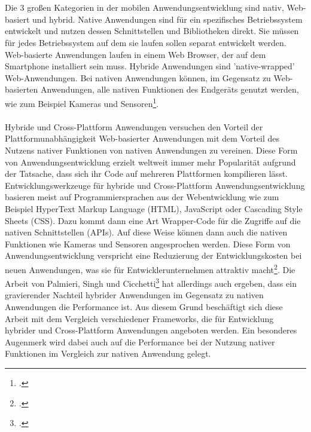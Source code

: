 \\
\\
Die 3 großen Kategorien in der mobilen Anwendungsentwicklung sind nativ, Web-basiert und hybrid. Native Anwendungen sind für ein spezifisches Betriebssystem entwickelt und nutzen dessen Schnittstellen und Bibliotheken direkt. Sie müssen für jedes Betriebssystem auf dem sie laufen sollen separat entwickelt werden. Web-basierte Anwendungen laufen in einem Web Browser, der auf dem Smartphone installiert sein muss. Hybride Anwendungen sind 'native-wrapped' Web-Anwendungen. Bei nativen Anwendungen können, im Gegensatz zu Web-basierten Anwendungen, alle nativen Funktionen des Endgeräts genutzt werden, wie zum Beispiel Kameras und Sensoren\footcite{ChallOppMobAppDev}. 
\\
\\
Hybride und Cross-Plattform Anwendungen versuchen den Vorteil der Plattformunabhängigkeit Web-basierter Anwendungen mit dem Vorteil des Nutzens nativer Funktionen von nativen Anwendungen zu vereinen. Diese Form von Anwendungsentwicklung erzielt weltweit immer mehr Popularität aufgrund der Tatsache, dass sich ihr Code auf mehreren Plattformen kompilieren lässt. Entwicklungswerkzeuge für hybride und Cross-Plattform Anwendungsentwicklung basieren meist auf Programmiersprachen aus der Webentwicklung wie zum Beispiel HyperText Markup Language (HTML), JavaScript oder Cascading Style Sheets (CSS). Dazu kommt dann eine Art Wrapper-Code für die Zugriffe auf die nativen Schnittstellen (APIs). Auf diese Weise können dann auch die nativen Funktionen wie Kameras und Sensoren angesprochen werden. Diese Form von Anwendungsentwicklung verspricht eine Reduzierung der Entwicklungskosten bei neuen Anwendungen, was sie für Entwicklerunternehmen attraktiv macht\footcite{ComparisonCrossPlatMobDevTools}. Die Arbeit von Palmieri, Singh und Cicchetti\footcite{ComparisonCrossPlatMobDevTools} hat allerdings auch ergeben, dass ein gravierender Nachteil hybrider Anwendungen im Gegensatz zu nativen Anwendungen die Performance ist. Aus diesem Grund beschäftigt sich diese Arbeit mit dem Vergleich verschiedener Frameworks, die für Entwicklung hybrider und Cross-Plattform Anwendungen angeboten werden. Ein besonderes Augenmerk wird dabei auch auf die Performance bei der Nutzung nativer Funktionen im Vergleich zur nativen Anwendung gelegt.